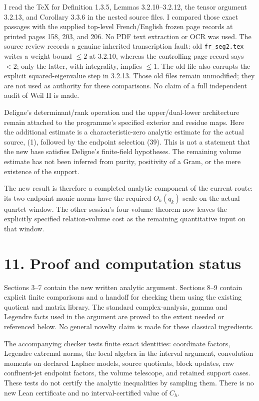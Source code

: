 \documentclass[
  11pt,
]{article}
\begin{document}
I read the TeX for Definition 1.3.5, Lemmas 3.2.10--3.2.12, the tensor
argument 3.2.13, and Corollary 3.3.6 in the nested source files. I
compared those exact passages with the supplied top-level French/English
frozen page records at printed pages 158, 203, and 206. No PDF text
extraction or OCR was used. The source review records a genuine
inherited transcription fault: old \texttt{fr\_seg2.tex} writes a weight
bound \(\le2\) at 3.2.10, whereas the controlling page record says
\(<2\); only the latter, with integrality, implies \(\le1\). The old
file also corrupts the explicit squared-eigenvalue step in 3.2.13. Those
old files remain unmodified; they are not used as authority for these
comparisons. No claim of a full independent audit of Weil II is made.

Deligne's determinant/rank operation and the upper/dual-lower
architecture remain attached to the programme's specified exterior and
residue maps. Here the additional estimate is a characteristic-zero
analytic estimate for the actual source, (1), followed by the endpoint
selection (39). This is not a statement that the new base satisfies
Deligne's finite-field hypotheses. The remaining volume estimate has not
been inferred from purity, positivity of a Gram, or the mere existence
of the support.

The new result is therefore a completed analytic component of the
current route: its two endpoint monic norms have the required
\(O_h(q_k)\) scale on the actual quartet window. The other session's
four-volume theorem now leaves the explicitly specified relation-volume
cost as the remaining quantitative input on that window.

\section{11. Proof and computation
status}\label{proof-and-computation-status}

Sections 3--7 contain the new written analytic argument. Sections 8--9
contain explicit finite comparisons and a handoff for checking them
using the existing quotient and matrix library. The standard
complex-analysis, gamma and Legendre facts used in the argument are
proved to the extent needed or referenced below. No general novelty
claim is made for these classical ingredients.

The accompanying checker tests finite exact identities: coordinate
factors, Legendre extremal norms, the local algebra in the interval
argument, convolution moments on declared Laplace models, source
quotients, block updates, raw confluent-jet endpoint factors, the volume
telescope, and retained support cases. These tests do not certify the
analytic inequalities by sampling them. There is no new Lean certificate
and no interval-certified value of \(C_h\).
\end{document}
